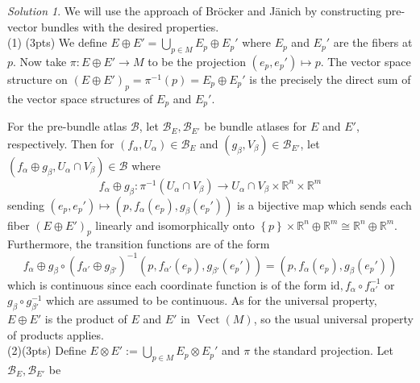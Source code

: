 \documentclass[reqno]{amsart}
\theoremstyle{definition}
\theoremstyle{remark}
\newtheorem*{solution}{Solution}
\DeclareMathOperator{\Vect}{Vect}
\newcommand{\id}{{\mathrm{id}}}
\begin{document}
\begin{solution}
    We will use
    the approach of Bröcker and Jänich by
    constructing pre-vector bundles with the desired properties.\\
    (1) (3pts) 
    We define
    $E \oplus E' = \bigcup_{p \in M} E_{p} \oplus E_{p}'$ 
    where $E_p$ and  $E_p'$ are the fibers at $p$.
    Now take $\pi \colon E \oplus E' \to M$ to be
    the projection $(e_p, e_p') \mapsto 
    p$.
    The vector space structure on
    $\left( E \oplus E' \right)_p =
    \pi^{-1}(p) = E_{p} \oplus E_{p}'$ is the
    precisely the direct sum of the vector space structures
    of $E_p$ and $E_p'$.

    For the pre-bundle atlas $\mathcal{B}$,
    let $ \mathcal{B}_E, \mathcal{B}_{E'}$ be
    bundle atlases for
     $E$ and $E'$, respectively.
     Then
     for  $\left( f_{\alpha}, U_{\alpha} \right) 
     \in \mathcal{B}_E$ and
     $\left( g_{\beta}, V_{\beta}
     \right) \in \mathcal{B}_{E'}$, let
     $\left( f_{\alpha} \oplus g_{\beta},
     U_{\alpha} \cap V_{\beta} \right) 
     \in \mathcal{B}$ where
     \[
     f_{\alpha} \oplus g_{\beta}
     \colon \pi^{-1} \left( U_{\alpha} \cap V_{\beta} \right) 
     \to U_{\alpha} \cap V_{\beta} \times \mathbb{R}^{n}
     \times \mathbb{R}^{m}
     \] 
     sending
     $\left( e_p, e_{p}' \right)  \mapsto
     \left( p, f_{\alpha}(e_p),
     g_{\beta}(e_p') \right) $
     is a bijective map
     which sends each fiber 
     $\left( E \oplus E' \right)_p$
     linearly and isomorphically
     onto
     $\left\{ p \right\} \times 
     \mathbb{R}^{n} \oplus \mathbb{R}^{m} 
     \cong \mathbb{R}^{n} \oplus \mathbb{R}^{m}$.
     Furthermore, the transition functions
     are of the form
     \[
     f_{\alpha}\oplus g_{\beta}
     \circ (f_{\alpha'} \oplus g_{\beta'})^{-1}
     (p, f_{\alpha'}(e_p),g_{\beta'}(e_p')) = 
     \left( p, f_\alpha(e_p), g_{\beta}(e_p') \right) 
     \] 
     which is continuous since each coordinate function
     is of the form
     $\id, f_{\alpha} \circ f_{\alpha'}^{-1}$ or
     $g_{\beta}\circ g_{\beta'}^{-1}$ which are
     assumed to be
     continuous.
     As for the universal property, 
     $E \oplus E'$ is the product of
     $E$ and $E'$ in
     $\Vect (M)$, so the usual universal property of
     products applies.\\
     \linebreak
     (2)(3pts) 
     Define
     $E \otimes E' :=
     \bigcup_{p \in M }
     E_p \otimes E_{p}'
     $ and
     $\pi$ the standard projection.
     Let $\mathcal{B}_E, \mathcal{B}_{E'}$ be

\end{solution}
\end{document}
